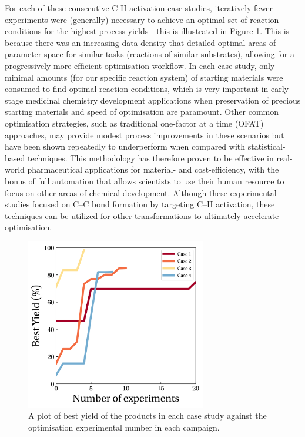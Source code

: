 For each of these consecutive C-H activation case studies, iteratively fewer experiments were (generally) necessary to achieve an optimal set of reaction conditions for the highest process yields - this is illustrated in Figure \ref{fig:optimisation_curves}. This is because there was an increasing data-density that detailed optimal areas of parameter space for similar tasks (reactions of similar substrates), allowing for a progressively more efficient optimisation workflow. In each case study, only minimal amounts (for our specific reaction system) of starting materials were consumed to find optimal reaction conditions, which is very important in early-stage medicinal chemistry development applications when preservation of precious starting materials and speed of optimisation are paramount. Other common optimisation strategies, such as traditional one-factor at a time (OFAT) approaches, may provide modest process improvements in these scenarios but have been shown repeatedly to underperform when compared with statistical-based techniques. This methodology has therefore proven to be effective in real-world pharmaceutical applications for material- and cost-efficiency, with the bonus of full automation that allows scientists to use their human resource to focus on other areas of chemical development. Although these experimental studies focused on C--C bond formation by targeting C--H activation, these techniques can be utilized for other transformations to ultimately accelerate optimisation.

\begin{figure}
    \centering
    \includegraphics[width=0.7\textwidth]{gfx/Chapter04/ch_activation_optimization_curves.png}
    \caption{A plot of best yield of the products in each case study against the optimisation experimental number in each campaign.}
    \label{fig:optimisation_curves}
\end{figure}



